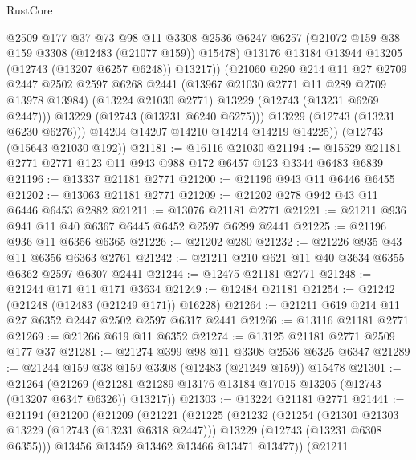 \begin{lexlean}{RustCore}
\begin{coremodule}
                @2509
                @177
                @37
                @73
                @98
                @11
                @3308
                @2536
                @6247
                @6257
                (@21072 @159 @38 @159 @3308 (@12483 (@21077 @159)) @15478)
                @13176
                @13184
                @13944
                @13205
                (@12743 (@13207 @6257 @6248))
                @13217))
            (@21060
              @290
              @214
              @11
              @27
              @2709
              @2447
              @2502
              @2597
              @6268
              @2441
              (@13967 @21030 @2771 @11 @289 @2709 @13978 @13984)
              (@13224 @21030 @2771)
              @13229
              (@12743 (@13231 @6269 @2447)))
            @13229
            (@12743 (@13231 @6240 @6275)))
          @13229
          (@12743 (@13231 @6230 @6276)))
        @14204
        @14207
        @14210
        @14214
        @14219
        @14225))
    (@12743 (@15643 @21030 @192))
@21181 := @16116 @21030
@21194 := @15529 @21181 @2771 @2771 @123 @11 @943 @988 @172 @6457 @123 @3344 @6483 @6839
@21196 := @13337 @21181 @2771
@21200 := @21196 @943 @11 @6446 @6455
@21202 := @13063 @21181 @2771
@21209 := @21202 @278 @942 @43 @11 @6446 @6453 @2882
@21211 := @13076 @21181 @2771
@21221 := @21211 @936 @941 @11 @40 @6367 @6445 @6452 @2597 @6299 @2441
@21225 := @21196 @936 @11 @6356 @6365
@21226 := @21202 @280
@21232 := @21226 @935 @43 @11 @6356 @6363 @2761
@21242 := @21211 @210 @621 @11 @40 @3634 @6355 @6362 @2597 @6307 @2441
@21244 := @12475 @21181 @2771
@21248 := @21244 @171 @11 @171 @3634
@21249 := @12484 @21181
@21254 := @21242 (@21248 (@12483 (@21249 @171)) @16228)
@21264 := @21211 @619 @214 @11 @27 @6352 @2447 @2502 @2597 @6317 @2441
@21266 := @13116 @21181 @2771
@21269 := @21266 @619 @11 @6352
@21274 := @13125 @21181 @2771 @2509 @177 @37
@21281 := @21274 @399 @98 @11 @3308 @2536 @6325 @6347
@21289 := @21244 @159 @38 @159 @3308 (@12483 (@21249 @159)) @15478
@21301 := @21264
    (@21269 (@21281 @21289 @13176 @13184 @17015 @13205 (@12743 (@13207 @6347 @6326)) @13217))
@21303 := @13224 @21181 @2771
@21441 := @21194
    (@21200
      (@21209
        (@21221
          (@21225
            (@21232
              (@21254
                (@21301 @21303 @13229 (@12743 (@13231 @6318 @2447)))
                @13229
                (@12743 (@13231 @6308 @6355)))
              @13456
              @13459
              @13462
              @13466
              @13471
              @13477))
          (@21211

\end{coremodule}
\end{lexlean}
